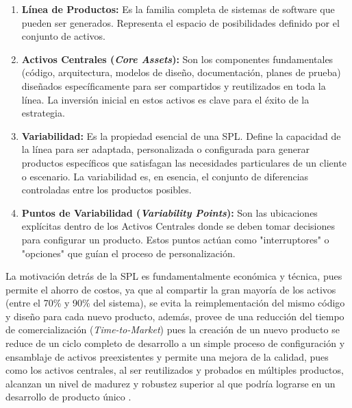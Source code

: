 {{{            
            \begin{enumerate}
                \item \textbf{Línea de Productos:} Es la familia completa de sistemas de software
                que pueden ser generados. Representa el espacio de posibilidades
                definido por el conjunto de activos.
                \item \textbf{Activos Centrales (\textit{Core Assets}):} Son los componentes fundamentales
                (código, arquitectura, modelos de diseño, documentación, planes de
                prueba) diseñados específicamente para ser compartidos y reutilizados
                en toda la línea. La inversión inicial en estos activos es clave para el
                éxito de la estrategia.
                \item \textbf{Variabilidad:} Es la propiedad esencial de una \ac{SPL}. Define la capacidad
                de la línea para ser adaptada, personalizada o configurada para generar
                productos específicos que satisfagan las necesidades particulares de un
                cliente o escenario. La variabilidad es, en esencia, el conjunto de
                diferencias controladas entre los productos posibles.
                \item \textbf{Puntos de Variabilidad (\textit{Variability Points}):} Son las ubicaciones
                explícitas dentro de los Activos Centrales donde se deben tomar
                decisiones para configurar un producto. Estos puntos actúan como
                "interruptores" o "opciones" que guían el proceso de personalización.
            \end{enumerate}

            La motivación detrás de la \ac{SPL} es fundamentalmente económica y técnica,
            pues permite el ahorro de costos, ya que al compartir la gran mayoría de los
            activos (entre el 70\% y 90\% del sistema), se evita la reimplementación del
            mismo código y diseño para cada nuevo producto, además, provee de una reducción del tiempo de comercialización (\textit{Time-to-Market}) pues la creación de
            un nuevo producto se reduce de un ciclo completo de desarrollo a un simple
            proceso de configuración y ensamblaje de activos preexistentes y permite una
            mejora de la calidad, pues como los activos centrales, al ser reutilizados y
            probados en múltiples productos, alcanzan un nivel de madurez y robustez
            superior al que podría lograrse en un desarrollo de producto único \citep{ingenieria_software_lps}.

}}}
